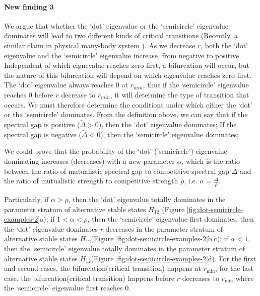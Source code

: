 \documentclass[a4paper,fleqn,12pt]{article}
\begin{document}
\paragraph*{New finding 3}
We argue that whether the `dot' eigenvalue or the `semicircle' eigenvalue dominates will lead to two different kinds of critical transitions (Recently, a similar claim in physical many-body system\cite{cubitt_undecidability_2015} 
).
As we decrease $r$, 
both the `dot' eigenvalue and the `semicircle' eigenvalue increase, from negative to positive. Independent of which eignevalue reaches zero first, a bifurcation will occur, but the nature of this bifurcation will depend on which eigenvalue reaches zero first.
The `dot' eigenvalue always reaches $0$ at $r_{min}$, %
thus if the `semicircle' eigenvalue reaches $0$ before $r$ decrease to $r_{min}$,
it will determine the type of transition that occurs. We must therefore determine the conditions under which either the `dot' or the `semicircle' dominates.
From the definition above, we can say that if the spectral gap is positive ($\widetilde{\Delta} > 0$),
then the `dot' eigenvalue dominates;
If the spectral gap is negative ($\widetilde{\Delta} < 0$),
then the `semicircle' eigenvalue dominates;

We could prove that the probability of the `dot' ('semicircle') eigenvalue dominating increases (decreases) with a new parameter $\alpha$,
which is the ratio between the ratio of mutualistic spectral gap to competitive spectral gap $\Delta$ and the ratio of mutualistic strength to competitive strength $\rho$, i.e. $\alpha = \frac{\Delta}{\rho}$.

Particularly, if $\alpha > \rho$, then the `dot' eigenvalue totally dominates in the parameter stratum of alternative stable states $H_{12}$ (Figure \ref{fig:dot-semicircle-examples-2}a); 
if $1 < \alpha < \rho $, then the `semicircle' eigenvalue first dominates, then the `dot' eigenvalue dominates $r$ decreases in the parameter stratum of alternative stable states $H_{12}$(Figure \ref{fig:dot-semicircle-examples-2}b,c); 
if $\alpha < 1$, then
the `semicircle' eigenvalue totally dominates in the parameter stratum of alternative stable states $H_{12}$(Figure \ref{fig:dot-semicircle-examples-2}d).
For the first and second cases, the bifurcation(critical transition) happens at $r_{\mathrm{min}}$, 
for the last case, the bifurcation(critical transition) happens before $r$ decreases to $r_{\mathrm{min}}$ where the `semicircle' eigenvalue first reaches 0.
\end{document}
